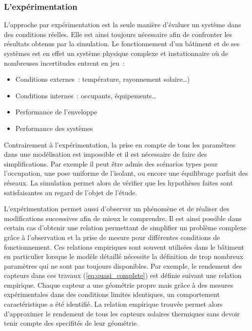 \subsubsection{L’expérimentation} %
\label{ssub:l_experimentation}
L’approche par expérimentation est la seule manière d’évaluer un système dans des
conditions réelles. Elle est ainsi toujours nécessaire afin de confronter les résultats
obtenus par la simulation.
Le fonctionnement d’un bâtiment et de ses systèmes est en effet un système physique
complexe et instationnaire où de nombreuses incertitudes entrent en jeu~:
\begin{itemize}
    \item Conditions externes~: température, rayonnement solaire\dots)
    \item Conditions internes~: occupants, équipements\dots
    \item Performance de l’enveloppe
    \item Performance des systèmes
\end{itemize}
Contrairement à l’expérimentation, la prise en compte de tous les paramètres dans une
modélisation est impossible et il est nécessaire de faire des simplifications. Par exemple
il peut être admis des scénarios types pour l’occupation, une pose uniforme de l’isolant,
ou encore une équilibrage parfait des réseaux. La simulation permet alors de vérifier que
les hypothèses faites sont satisfaisantes au regard de l’objet de l’étude.

L’expérimentation permet aussi d’observer un phénomène et de réaliser des modifications
successives afin de mieux le comprendre. Il est ainsi possible dans certain cas d’obtenir
une relation permettant de simplifier un problème complexe grâce à l’observation et la
prise de mesure pour différentes conditions de fonctionnement. Ces relations empiriques
sont souvent utilisées dans le bâtiment en particulier lorsque le modèle détaillé
nécessite la définition de trop nombreux paramètres qui ne sont pas toujours disponibles.
Par exemple, le rendement des capteurs dans ces travaux (\ref{eq:quasi_complete}) est
définie suivant une relation empirique. Chaque capteur a une géométrie propre mais grâce à
des mesures expérimentales dans des conditions limites identiques, un comportement
caractéristique a été identifié. La relation empirique trouvée permet alors d’approximer le
rendement de tous les capteurs solaires thermiques sans devoir tenir compte des specifités
de leur géométrie.


